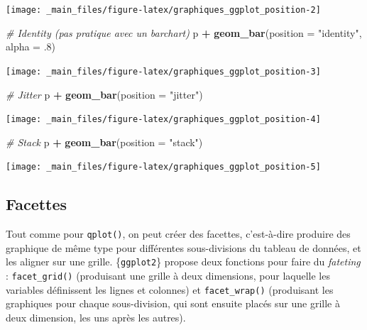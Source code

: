 \documentclass[
  11pt,
]{book}
\newenvironment{Shaded}{\begin{snugshade}}{\end{snugshade}}
\newcommand{\CommentTok}[1]{\textcolor[rgb]{0.56,0.35,0.01}{\textit{#1}}}
\newcommand{\DataTypeTok}[1]{\textcolor[rgb]{0.13,0.29,0.53}{#1}}
\newcommand{\FloatTok}[1]{\textcolor[rgb]{0.00,0.00,0.81}{#1}}
\newcommand{\KeywordTok}[1]{\textcolor[rgb]{0.13,0.29,0.53}{\textbf{#1}}}
\newcommand{\NormalTok}[1]{#1}
\newcommand{\OperatorTok}[1]{\textcolor[rgb]{0.81,0.36,0.00}{\textbf{#1}}}
\newcommand{\StringTok}[1]{\textcolor[rgb]{0.31,0.60,0.02}{#1}}
\numberwithin{equation}{section}
\numberwithin{countremarque}{section}
\begin{document}
\begin{center}\texttt{[image: \_main\_files/figure-latex/graphiques\_ggplot\_position-2]} \end{center}

\begin{Shaded}
\begin{Highlighting}[]
\CommentTok{\# Identity (pas pratique avec un barchart)}
\NormalTok{p }\OperatorTok{+}\StringTok{ }\KeywordTok{geom\_bar}\NormalTok{(}\DataTypeTok{position =} \StringTok{"identity"}\NormalTok{, }\DataTypeTok{alpha =} \FloatTok{.8}\NormalTok{)}
\end{Highlighting}
\end{Shaded}

\begin{center}\texttt{[image: \_main\_files/figure-latex/graphiques\_ggplot\_position-3]} \end{center}

\begin{Shaded}
\begin{Highlighting}[]
\CommentTok{\# Jitter}
\NormalTok{p }\OperatorTok{+}\StringTok{ }\KeywordTok{geom\_bar}\NormalTok{(}\DataTypeTok{position =} \StringTok{"jitter"}\NormalTok{)}
\end{Highlighting}
\end{Shaded}

\begin{center}\texttt{[image: \_main\_files/figure-latex/graphiques\_ggplot\_position-4]} \end{center}

\begin{Shaded}
\begin{Highlighting}[]
\CommentTok{\# Stack}
\NormalTok{p }\OperatorTok{+}\StringTok{ }\KeywordTok{geom\_bar}\NormalTok{(}\DataTypeTok{position =} \StringTok{"stack"}\NormalTok{)}
\end{Highlighting}
\end{Shaded}

\begin{center}\texttt{[image: \_main\_files/figure-latex/graphiques\_ggplot\_position-5]} \end{center}

\hypertarget{graphiques_ggplot_facet}{%
\subsection{Facettes}\label{graphiques_ggplot_facet}}

Tout comme pour \texttt{qplot()}, on peut créer des facettes, c'est-à-dire produire des graphique de même type pour différentes sous-divisions du tableau de données, et les aligner sur une grille. \{\texttt{ggplot2}\} propose deux fonctions pour faire du \emph{fateting} : \texttt{facet\_grid()} (produisant une grille à deux dimensions, pour laquelle les variables définissent les lignes et colonnes) et \texttt{facet\_wrap()} (produisant les graphiques pour chaque sous-division, qui sont ensuite placés sur une grille à deux dimension, les uns après les autres).
\end{document}
